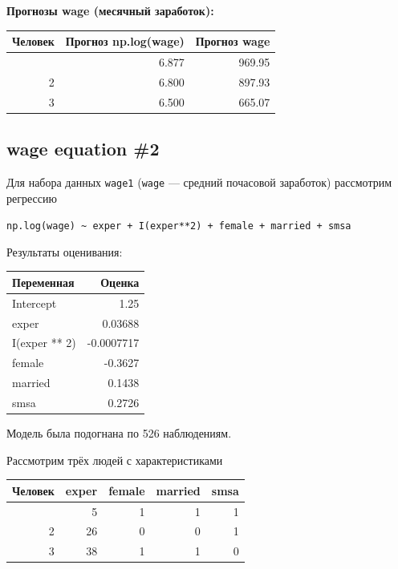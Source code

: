 \documentclass[
  russian,
]{article}
\newcounter{none} %
\begin{document}
\textbf{Прогнозы wage (месячный заработок):}

{\def\LTcaptype{none} %
\begin{longtable}[]{@{}rrr@{}}
\toprule\noalign{}
Человек & Прогноз np.log(wage) & Прогноз wage \\
\midrule\noalign{}
\endhead
\bottomrule\noalign{}
\endlastfoot
1 & 6.877 & 969.95 \\
2 & 6.800 & 897.93 \\
3 & 6.500 & 665.07 \\
\end{longtable}
}

\subsection{wage equation \#2}\label{wage-equation-2}

Для набора данных \texttt{wage1} (\texttt{wage} --- средний почасовой
заработок) рассмотрим регрессию

\texttt{np.log(wage)\ \textasciitilde{}\ exper\ +\ I(exper**2)\ +\ female\ +\ married\ +\ smsa}

Результаты оценивания:

{\def\LTcaptype{none} %
\begin{longtable}[]{@{}lr@{}}
\toprule\noalign{}
Переменная & Оценка \\
\midrule\noalign{}
\endhead
\bottomrule\noalign{}
\endlastfoot
Intercept & 1.25 \\
exper & 0.03688 \\
I(exper ** 2) & -0.0007717 \\
female & -0.3627 \\
married & 0.1438 \\
smsa & 0.2726 \\
\end{longtable}
}

Модель была подогнана по 526 наблюдениям.

Рассмотрим трёх людей с характеристиками

{\def\LTcaptype{none} %
\begin{longtable}[]{@{}rrrrr@{}}
\toprule\noalign{}
Человек & exper & female & married & smsa \\
\midrule\noalign{}
\endhead
\bottomrule\noalign{}
\endlastfoot
1 & 5 & 1 & 1 & 1 \\
2 & 26 & 0 & 0 & 1 \\
3 & 38 & 1 & 1 & 0 \\
\end{longtable}
}
\end{document}
